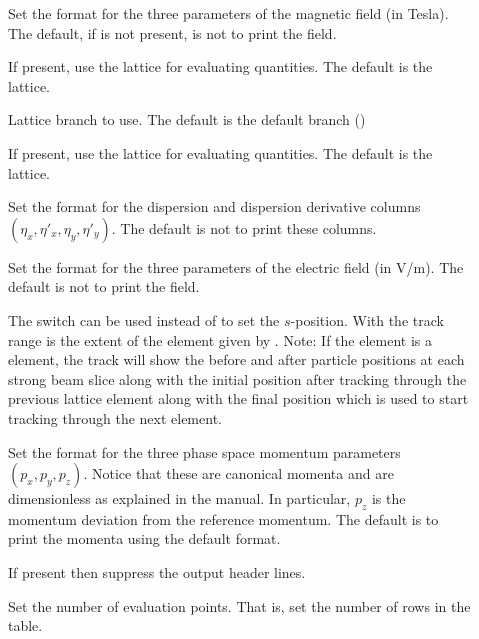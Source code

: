 {{{{{{{{{{{\begin{description}
\item[] \Newline
Set the format for the three parameters of the magnetic field (in Tesla). The default, if
 is not present, is not to print the field.
%
\item[] \Newline
If present, use the  lattice for evaluating quantities. The default is the 
lattice.
%
\item[] \Newline
Lattice branch to use. The default is the default branch ()
%
\item[] \Newline
If present, use the  lattice for evaluating quantities. The default is the 
lattice.
%
\item[] \Newline
Set the format for the dispersion and dispersion derivative columns $(\eta_x, \eta'_x, \eta_y, \eta'_y)$. 
The default is not to print these columns.
%
\item[] \Newline
Set the format for the three parameters of the electric field (in V/m). The default is not to print
the field.
%
\item[] \Newline
The  switch can be used instead of  to set the $s$-position. With
 the track range is the extent of the element given by . Note: If the
element is a  element, the track will show the before and after particle positions at
each strong beam slice along with the initial position after tracking through the previous lattice
element along with the final position which is used to start tracking through the next element.
%
\item[] \Newline
Set the format for the three phase space momentum parameters $(p_x, p_y, p_z)$. Notice that these
are canonical momenta and are dimensionless as explained in the \bmad manual. In particular, $p_z$
is the momentum deviation from the reference momentum. The default is to print the momenta using the
default format.
%
\item[] \Newline
If present then suppress the output header lines.
%
\item[] \Newline
Set the number of evaluation points. That is, set the number of rows in the table.
%
\item[] \Newline

\end{description}}}}}}}}}}}}
